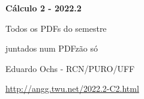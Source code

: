 \documentclass[oneside,12pt]{article}
\begin{document}

\def\u#1{\par{\footnotesize \url{#1}}}

\def\drafturl{http://angg.twu.net/LATEX/2022-2-C2.pdf}
\def\drafturl{http://angg.twu.net/2022.2-C2.html}
\def\draftfooter{\tiny \href{\drafturl}{\jobname{}} \ColorBrown{\shorttoday{} \hours}}



%

\thispagestyle{empty}

\begin{center}

\vspace*{1.2cm}

{\bf \Large Cálculo 2 - 2022.2}

\bsk

Todos os PDFs do semestre

juntados num PDFzão só

\bsk

Eduardo Ochs - RCN/PURO/UFF

\url{http://angg.twu.net/2022.2-C2.html}

\end{center}

\newpage

\def\incl#1{}

\incl{2022-2-C2-buraco}

\incl{2022-2-C2-mathologermovel}

\end{document}
